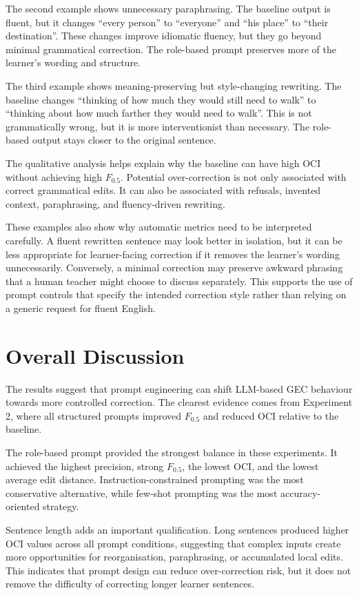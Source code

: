 The second example shows unnecessary paraphrasing. The baseline output is fluent, but it changes ``every person'' to ``everyone'' and ``his place'' to ``their destination''. These changes improve idiomatic fluency, but they go beyond minimal grammatical correction. The role-based prompt preserves more of the learner's wording and structure.

The third example shows meaning-preserving but style-changing rewriting. The baseline changes ``thinking of how much they would still need to walk'' to ``thinking about how much farther they would need to walk''. This is not grammatically wrong, but it is more interventionist than necessary. The role-based output stays closer to the original sentence.

The qualitative analysis helps explain why the baseline can have high OCI without achieving high $F_{0.5}$. Potential over-correction is not only associated with correct grammatical edits. It can also be associated with refusals, invented context, paraphrasing, and fluency-driven rewriting.

These examples also show why automatic metrics need to be interpreted carefully. A fluent rewritten sentence may look better in isolation, but it can be less appropriate for learner-facing correction if it removes the learner's wording unnecessarily. Conversely, a minimal correction may preserve awkward phrasing that a human teacher might choose to discuss separately. This supports the use of prompt controls that specify the intended correction style rather than relying on a generic request for fluent English.

\section{Overall Discussion}

The results suggest that prompt engineering can shift LLM-based GEC behaviour towards more controlled correction. The clearest evidence comes from Experiment 2, where all structured prompts improved $F_{0.5}$ and reduced OCI relative to the baseline.

The role-based prompt provided the strongest balance in these experiments. It achieved the highest precision, strong $F_{0.5}$, the lowest OCI, and the lowest average edit distance. Instruction-constrained prompting was the most conservative alternative, while few-shot prompting was the most accuracy-oriented strategy.

Sentence length adds an important qualification. Long sentences produced higher OCI values across all prompt conditions, suggesting that complex inputs create more opportunities for reorganisation, paraphrasing, or accumulated local edits. This indicates that prompt design can reduce over-correction risk, but it does not remove the difficulty of correcting longer learner sentences.

